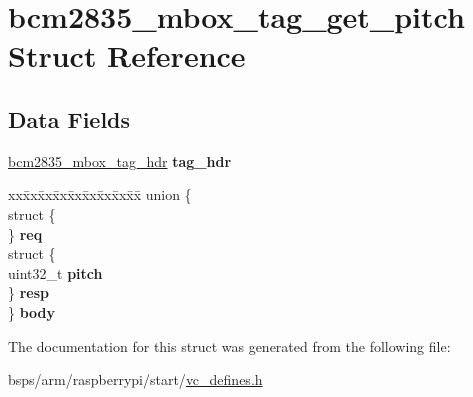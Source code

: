 \hypertarget{structbcm2835__mbox__tag__get__pitch}{}\section{bcm2835\+\_\+mbox\+\_\+tag\+\_\+get\+\_\+pitch Struct Reference}
\label{structbcm2835__mbox__tag__get__pitch}
\subsection*{Data Fields}
\begin{DoxyCompactItemize}
\item 
\mbox{\label{structbcm2835__mbox__tag__get__pitch_ae91301207ccd42aebb12eaa2bf292290}} 
\mbox{\hyperlink{structbcm2835__mbox__tag__hdr}{bcm2835\+\_\+mbox\+\_\+tag\+\_\+hdr}} {\bfseries tag\+\_\+hdr}
\item 
\mbox{\label{structbcm2835__mbox__tag__get__pitch_a6ac7424c1d38572f2077a6a82f4b122b}} 
\begin{tabbing}
xx\=xx\=xx\=xx\=xx\=xx\=xx\=xx\=xx\=\kill
union \{\\
\>struct \{\\
\>\} {\bfseries req}\\
\>struct \{\\
\>\>uint32\_t {\bfseries pitch}\\
\>\} {\bfseries resp}\\
\} {\bfseries body}\\

\end{tabbing}\end{DoxyCompactItemize}


The documentation for this struct was generated from the following file\+:\begin{DoxyCompactItemize}
\item 
bsps/arm/raspberrypi/start/\mbox{\hyperlink{vc__defines_8h}{vc\+\_\+defines.\+h}}\end{DoxyCompactItemize}
